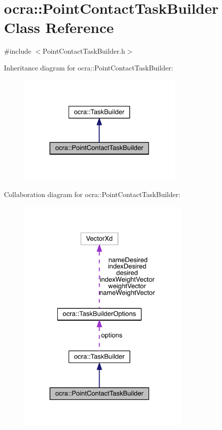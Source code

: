 \hypertarget{classocra_1_1PointContactTaskBuilder}{}\section{ocra\+:\+:Point\+Contact\+Task\+Builder Class Reference}
\label{classocra_1_1PointContactTaskBuilder}


{\ttfamily \#include $<$Point\+Contact\+Task\+Builder.\+h$>$}



Inheritance diagram for ocra\+:\+:Point\+Contact\+Task\+Builder\+:\nopagebreak
\begin{figure}[H]
\begin{center}
\leavevmode
\includegraphics[width=230pt]{de/d67/classocra_1_1PointContactTaskBuilder__inherit__graph}
\end{center}
\end{figure}


Collaboration diagram for ocra\+:\+:Point\+Contact\+Task\+Builder\+:\nopagebreak
\begin{figure}[H]
\begin{center}
\leavevmode
\includegraphics[width=239pt]{dc/daa/classocra_1_1PointContactTaskBuilder__coll__graph}
\end{center}
\end{figure}
